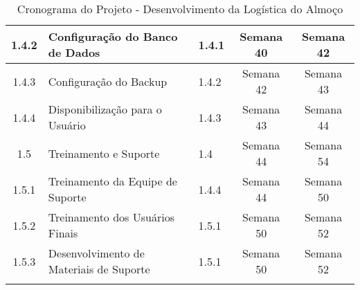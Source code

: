 \documentclass{article}
\begin{document}
\begin{longtable}{|c|l|l|c|c|}
\hline
1.4.2 & Configuração do Banco de Dados & 1.4.1 & Semana 40 & Semana 42 \\
\hline
1.4.3 & Configuração do Backup & 1.4.2 & Semana 42 & Semana 43 \\
\hline
1.4.4 & Disponibilização para o Usuário & 1.4.3 & Semana 43 & Semana 44 \\
\hline
1.5 & Treinamento e Suporte & 1.4 & Semana 44 & Semana 54 \\
\hline
1.5.1 & Treinamento da Equipe de Suporte & 1.4.4 & Semana 44 & Semana 50 \\
\hline
1.5.2 & Treinamento dos Usuários Finais & 1.5.1 & Semana 50 & Semana 52 \\
\hline
1.5.3 & Desenvolvimento de Materiais de Suporte & 1.5.1 & Semana 50 & Semana 52 \\
\hline
\caption{Cronograma do Projeto - Desenvolvimento da Logística do Almoço}
\label{tab:cronograma-logistica-almoco}
\end{longtable}
\end{document}
